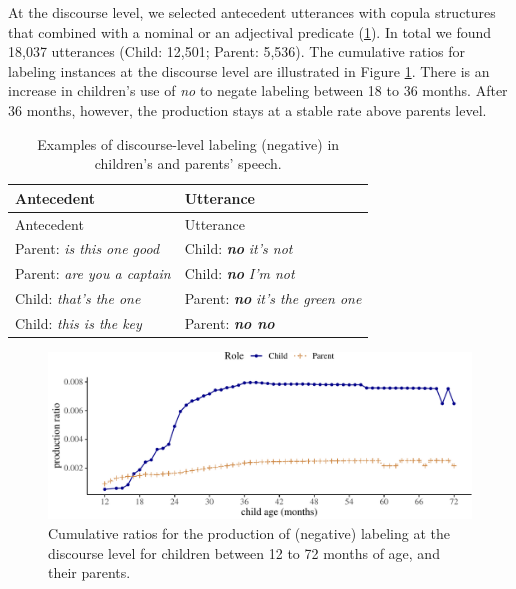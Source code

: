 \documentclass[
  man,floatsintext]{apa6}
\begin{document}
At the discourse level, we selected antecedent utterances with copula structures that combined with a nominal or an adjectival predicate (\ref{tab:dislabel}). In total we found 18,037 utterances (Child: 12,501; Parent: 5,536). The cumulative ratios for labeling instances at the discourse level are illustrated in Figure \ref{fig:learningdiscourse}. There is an increase in children's use of \emph{no} to negate labeling between 18 to 36 months. After 36 months, however, the production stays at a stable rate above parents level.

\begin{longtable}[]{@{}ll@{}}
\caption{\label{tab:dislabel} Examples of discourse-level labeling (negative) in children's and parents' speech.}\tabularnewline
\toprule\noalign{}
Antecedent & Utterance \\
\midrule\noalign{}
\endfirsthead
\toprule\noalign{}
Antecedent & Utterance \\
\midrule\noalign{}
\endhead
\bottomrule\noalign{}
\endlastfoot
Parent: \emph{is this one good} & Child: \textbf{\emph{no}} \emph{it's not} \\
Parent: \emph{are you a captain} & Child: \textbf{\emph{no}} \emph{I'm not} \\
Child: \emph{that's the one} & Parent: \textbf{\emph{no}} \emph{it's the green one} \\
Child: \emph{this is the key} & Parent: \textbf{\emph{no no}} \\
\end{longtable}

\begin{figure}[H]

{\centering \includegraphics{neg_construction_article_files/figure-latex/learningdiscourse-1} 

}

\caption{Cumulative ratios for the production of (negative) labeling at the discourse level for children between 12 to 72 months of age, and their parents.}\label{fig:learningdiscourse}
\end{figure}
\end{document}
